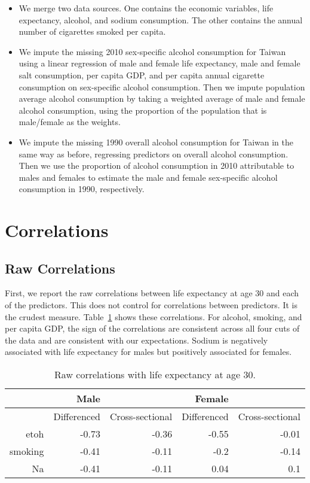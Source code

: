 \documentclass[11pt]{article}\usepackage[]{graphicx}\usepackage[]{color}
\begin{document}
\begin{itemize}
\item We merge two data sources. One contains the economic variables, life expectancy, alcohol, and sodium consumption. The other contains the annual number of cigarettes smoked per capita.
\item We impute the missing 2010 sex-specific alcohol consumption for Taiwan using a linear regression of male and female life expectancy, male and female salt consumption, per capita GDP, and per capita annual cigarette consumption on sex-specific alcohol consumption. Then we impute population average alcohol consumption by taking a weighted average of male and female alcohol consumption, using the proportion of the population that is male/female as the weights.
\item We impute the missing 1990 overall alcohol consumption for Taiwan in the same way as before, regressing predictors on overall alcohol consumption. Then we use the proportion of alcohol consumption in 2010 attributable to males and females to estimate the male and female sex-specific alcohol consumption in 1990, respectively.
\end{itemize}






\section{Correlations}
\subsection{Raw Correlations}
First, we report the raw correlations between life expectancy at age 30 and each of the predictors.
This does not control for correlations between predictors.
It is the crudest measure.
Table~\ref{tab:raw_corr} shows these correlations.
For alcohol, smoking, and per capita GDP, the sign of the correlations are consistent across all four cuts of the data and are consistent with our expectations.
Sodium is negatively associated with life expectancy for males but positively associated for females.

\begin{table}[ht]
\centering
\begin{tabular}{r|rr|rr}
   \hline
 & Male &  & Female &  \\ 
   \hline
   & Differenced & Cross-sectional & Differenced & Cross-sectional \\ 
   \hline
etoh & -0.73 & -0.36 & -0.55 & -0.01 \\ 
  smoking & -0.41 & -0.11 & -0.2 & -0.14 \\ 
  Na & -0.41 & -0.11 & 0.04 & 0.1 \\ 
   \hline
\end{tabular}
\caption{Raw correlations with life expectancy at age 30.} 
\label{tab:raw_corr}
\end{table}
\end{document}

